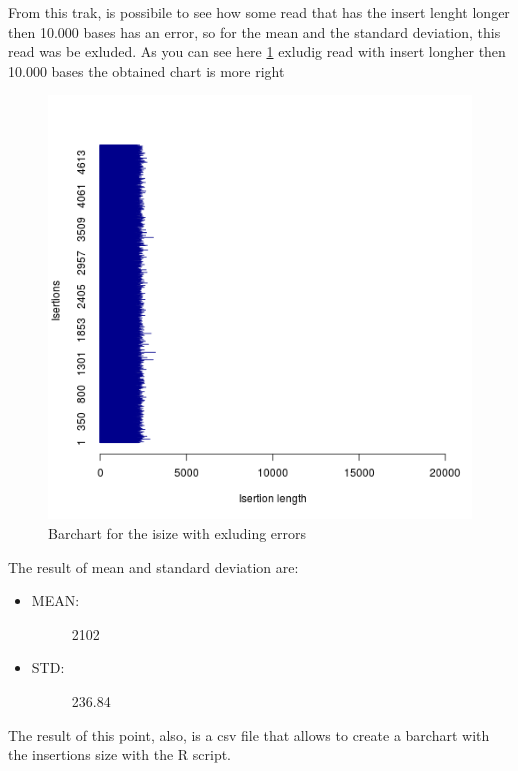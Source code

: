 From this trak, is possibile to see how some read that has the insert lenght longer then 10.000 bases has an error, so for the mean and the standard deviation, this read was be exluded.
As you can see here \ref{fig:2} exludig read with insert longher then 10.000 bases the obtained chart is more right
 \begin{figure}[H]
				\centering
				\includegraphics[scale=0.8]{immagini/r1.png}
				\caption{Barchart for the isize with exluding errors}\label{fig:2}
				\end{figure}

The result of mean and standard deviation are:
\begin{itemize}
\item \begin{description}
		\item[MEAN:] 2102
  \end{description}
\end{itemize}

\begin{itemize}
\item \begin{description}
		\item[STD:] 236.84
  \end{description}
\end{itemize}


The result of this point, also, is a csv file that allows to create a barchart with the insertions size with the R script.

